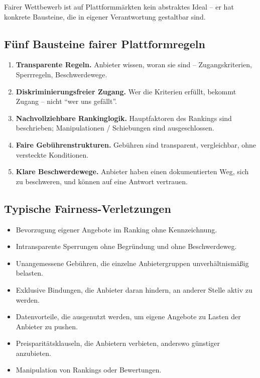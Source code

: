 \documentclass[11pt,a4paper,oneside]{article}
\newcommand{\fachbegriff}[1]{\textbf{#1}}
\begin{document}
Fairer Wettbewerb ist auf Plattformmärkten kein abstraktes Ideal -- er hat konkrete Bausteine, die in eigener Verantwortung gestaltbar sind.

\subsection{Fünf Bausteine fairer Plattformregeln}

\begin{enumerate}
  \item \fachbegriff{Transparente Regeln.} Anbieter wissen, woran sie sind -- Zugangskriterien, Sperrregeln, Beschwerdewege.
  \item \fachbegriff{Diskriminierungsfreier Zugang.} Wer die Kriterien erfüllt, bekommt Zugang -- nicht ``wer uns gefällt''.
  \item \fachbegriff{Nachvollziehbare Rankinglogik.} Hauptfaktoren des Rankings sind beschrieben; Manipulationen / Schiebungen sind ausgeschlossen.
  \item \fachbegriff{Faire Gebührenstrukturen.} Gebühren sind transparent, vergleichbar, ohne versteckte Konditionen.
  \item \fachbegriff{Klare Beschwerdewege.} Anbieter haben einen dokumentierten Weg, sich zu beschweren, und können auf eine Antwort vertrauen.
\end{enumerate}

\subsection{Typische Fairness-Verletzungen}

\begin{itemize}
  \item Bevorzugung eigener Angebote im Ranking ohne Kennzeichnung.
  \item Intransparente Sperrungen ohne Begründung und ohne Beschwerdeweg.
  \item Unangemessene Gebühren, die einzelne Anbietergruppen unverhältnismäßig belasten.
  \item Exklusive Bindungen, die Anbieter daran hindern, an anderer Stelle aktiv zu werden.
  \item Datenvorteile, die ausgenutzt werden, um eigene Angebote zu Lasten der Anbieter zu pushen.
  \item Preisparitätsklauseln, die Anbietern verbieten, anderswo günstiger anzubieten.
  \item Manipulation von Rankings oder Bewertungen.
\end{itemize}
\end{document}
